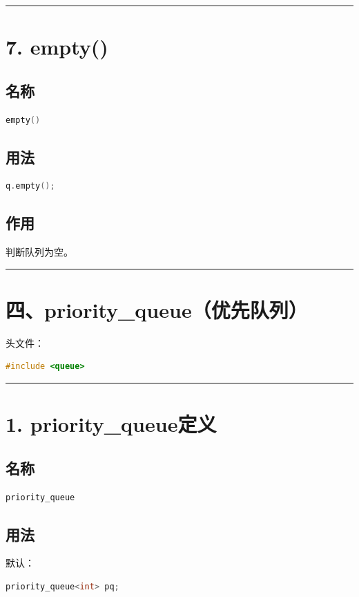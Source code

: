 \documentclass[10pt,twocolumn]{extarticle}
\begin{document}
\noindent\rule{\linewidth}{0.4pt}

\section{7. empty()}

\subsection{名称}
\begin{lstlisting}[language=C++]
empty()
\end{lstlisting}

\subsection{用法}
\begin{lstlisting}[language=C++]
q.empty();
\end{lstlisting}

\subsection{作用}
判断队列为空。

\noindent\rule{\linewidth}{0.4pt}

\section{四、priority\_queue（优先队列）}

头文件：
\begin{lstlisting}[language=C++]
#include <queue>
\end{lstlisting}

\noindent\rule{\linewidth}{0.4pt}

\section{1. priority\_queue定义}

\subsection{名称}
\begin{lstlisting}[language=C++]
priority_queue
\end{lstlisting}

\subsection{用法}
默认：
\begin{lstlisting}[language=C++]
priority_queue<int> pq;
\end{lstlisting}
\end{document}
